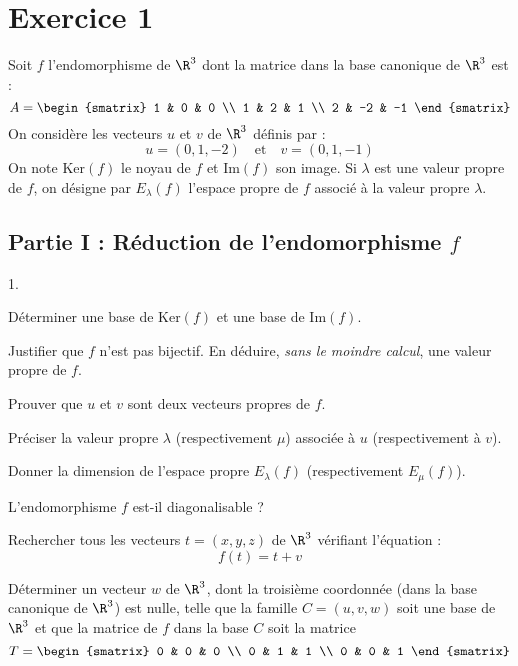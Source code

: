 \documentclass[11pt]{article}%
\begin{document}
\indent \vspace{0.3cm}


\vspace{0.5cm}


\section*{Exercice 1}

\noindent Soit $f$ l'endomorphisme de $\R^{3}$ dont la matrice dans la
base canonique de $\R^{3}$ est :
\[
 A = \begin{smatrix}
1 & 0 & 0 \\
1 & 2 & 1 \\
2 & -2 & -1
\end{smatrix}
\]
On considère les vecteurs $u$ et $v$ de $\R^{3}$ définis par :
\[
 u = (0,1,-2) \quad\text{et}\quad v = (0,1,-1) 
\]
On note $\mathrm{Ker}(f)$ le noyau de $f$ et $\mathrm{Im}(f)$ son
image.
Si $\lambda$ est une valeur propre de $f$, on désigne par
$E_{\lambda}(f)$ l'espace propre de $f$ associé à la valeur propre
$\lambda$.

\subsection*{Partie I : Réduction de l'endomorphisme $f$}

\begin{noliste}{1.}
 \setlength{\itemsep}{4mm}
\item Déterminer une base de $\mathrm{Ker}(f)$ et une base de
$\mathrm{Im}(f)$.

\item Justifier que $f$ n'est pas bijectif. En déduire, \textit{sans le
moindre calcul}, une valeur propre de $f$.

\item Prouver que $u$ et $v$ sont deux vecteurs propres de $f$.

Préciser la valeur propre $\lambda$ (respectivement $\mu$) associée à
$u$ (respectivement à $v$).

Donner la dimension de l'espace propre $E_{\lambda}(f)$ (respectivement
$E_{\mu}(f)$).

\item L'endomorphisme $f$ est-il diagonalisable ?

\item Rechercher tous les vecteurs $t = (x,y,z)$ de $\R^{3}$ vérifiant
l'équation :
\[
 f(t) = t + v 
\]

\item Déterminer un vecteur $w$ de $\R^{3}$, dont la troisième
coordonnée (dans la base canonique de $\R^{3}$) est nulle, telle que la
famille $C = (u,v,w)$ soit une base de $\R^{3}$ et que la matrice de
$f$ dans la base $C$ soit la matrice 
\[
 T = \begin{smatrix}
0 & 0 & 0 \\
0 & 1 & 1 \\
0 & 0 & 1
\end{smatrix}
\]
\end{noliste}
\end{document}
